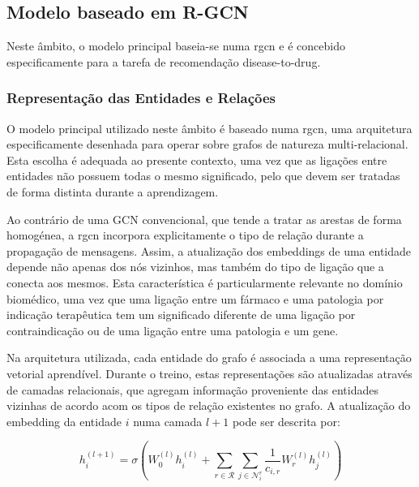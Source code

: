 \subsection{Modelo baseado em R-GCN}
\label{subsec:modelo-rgcn}
Neste âmbito, o modelo principal baseia-se numa \acrshort{rgcn} e é concebido especificamente para a tarefa de recomendação disease-to-drug.%

\subsubsection{Representação das Entidades e Relações}
\label{subsubsec:representacao-entidades-relacoes}
O modelo principal utilizado neste âmbito é baseado numa \acrshort{rgcn}, uma arquitetura especificamente desenhada para operar sobre grafos de natureza multi-relacional. Esta escolha é adequada ao presente contexto, uma vez que as ligações entre entidades não possuem todas o mesmo significado, pelo que devem ser tratadas de forma distinta durante a aprendizagem.

Ao contrário de uma GCN convencional, que tende a tratar as arestas de forma homogénea, a \acrshort{rgcn} incorpora explicitamente o tipo de relação durante a propagação de mensagens. Assim, a atualização dos embeddings de uma entidade depende não apenas dos nós vizinhos, mas também do tipo de ligação que a conecta aos mesmos. Esta característica é particularmente relevante no domínio biomédico, uma vez que uma ligação entre um fármaco e uma patologia por indicação terapêutica tem um significado diferente de uma ligação por contraindicação ou de uma ligação entre uma patologia e um gene.

Na arquitetura utilizada, cada entidade do grafo é associada a uma representação vetorial aprendível. Durante o treino, estas representações são atualizadas através de camadas relacionais, que agregam informação proveniente das entidades vizinhas de acordo acom os tipos de relação existentes no grafo. A atualização do embedding da entidade \(i\) numa camada \(l+1\) pode ser descrita por:

\[h_i^{(l+1)}=\sigma\left(W_0^{(l)} h_i^{(l)}+\sum_{r \in \mathcal{R}}\sum_{j \in \mathcal{N}_i^r}\frac{1}{c_{i,r}}W_r^{(l)} h_j^{(l)}\right)\]

